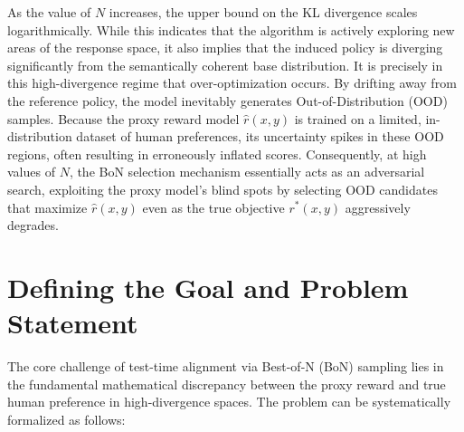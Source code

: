 \documentclass[a4paper,11pt]{article}
\begin{document}
As the value of $N$ increases, the upper bound on the KL divergence scales logarithmically. While this indicates that the algorithm is actively exploring new areas of the response space, it also implies that the induced policy is diverging significantly from the semantically coherent base distribution. It is precisely in this high-divergence regime that over-optimization occurs. By drifting away from the reference policy, the model inevitably generates Out-of-Distribution (OOD) samples. Because the proxy reward model $\hat{r}(x, y)$ is trained on a limited, in-distribution dataset of human preferences, its uncertainty spikes in these OOD regions, often resulting in erroneously inflated scores. Consequently, at high values of $N$, the BoN selection mechanism essentially acts as an adversarial search, exploiting the proxy model's blind spots by selecting OOD candidates that maximize $\hat{r}(x, y)$ even as the true objective $r^*(x, y)$ aggressively degrades.

\section{Defining the Goal and Problem Statement}
The core challenge of test-time alignment via Best-of-N (BoN) sampling lies in the fundamental mathematical discrepancy between the proxy reward and true human preference in high-divergence spaces. The problem can be systematically formalized as follows:
\end{document}
